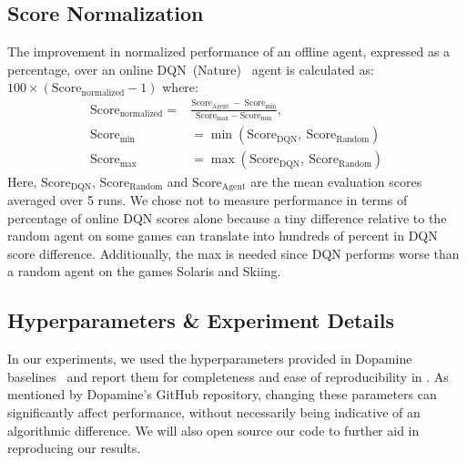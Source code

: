 \subsection{Score Normalization}\label{sec:score_normalization}
The improvement in normalized performance of an offline agent,
expressed as a percentage, over an online DQN~(Nature)~\citep{mnih2015human} agent is calculated as: $100 \times (\mathrm{Score_{normalized}} - 1)$ where:
\begin{align}\label{eq:score_normalize}
\mathrm{Score_{normalized}} ={}& \frac{\mathrm{Score_{Agent}}\ -\ \mathrm{Score_{min}}}
{\mathrm{Score_{max}} - \mathrm{Score_{min}}},\\
\mathrm{Score_{min}} &= \min(\mathrm{Score_{DQN}},\ \mathrm{Score_{Random}}) \nonumber\\
\mathrm{Score_{max}} &= \max(\mathrm{Score_{DQN}},\ \mathrm{Score_{Random}}) \nonumber
\end{align}
Here, $\mathrm{Score_{DQN}}$, $\mathrm{Score_{Random}}$ and $\mathrm{Score_{Agent}}$ are the mean evaluation scores averaged over 5 runs.
We chose not to measure performance in terms of percentage of online DQN scores alone
because a tiny difference relative to the random agent on some
games can translate into hundreds of percent in DQN score difference. Additionally, the max is needed
since DQN performs worse than a random agent on the games Solaris and Skiing.

\subsection{Hyperparameters \& Experiment Details}\label{sec:hyperparameters}
In our experiments, we used the hyperparameters provided in Dopamine baselines~\citep{castro2018dopamine} and report them for
completeness and ease of reproducibility in . As mentioned by Dopamine's GitHub repository,
changing these parameters can significantly affect performance, without necessarily being indicative of an algorithmic difference.
We will also open source our code to further aid in reproducing our results.

